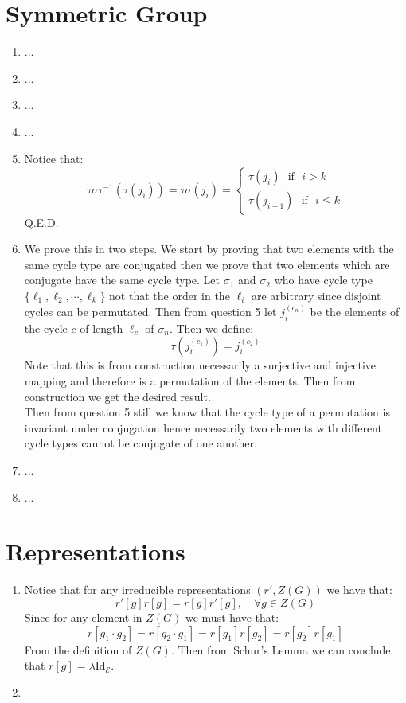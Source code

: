 \documentclass[10pt,a4paper]{book}
\begin{document}
\section{Symmetric Group}
\begin{enumerate}
\item ...

\item ...

\item ...

\item ...

\item Notice that:
\[
\tau \sigma \tau^{-1} ( \tau(j_i)) = \tau \sigma (j_i) = \begin{cases}
\tau(j_i) \mbox{~~if~~} i > k\\
\tau(j_{i+1}) \mbox{~~if~~} i \leq k
\end{cases}
\]
Q.E.D.

\item We prove this in two steps. We start by proving that two elements with the same cycle type are conjugated then we prove that two elements which are conjugate have the same cycle type. Let $\sigma_1$ and $\sigma_2$ who have cycle type $\{\ell_1, \ell_2, \cdots, \ell_k\}$ not that the order in the $\ell_i$ are arbitrary since disjoint cycles can be permutated. Then from question 5 let $j_i^{(c_n)}$ be the elements of the cycle $c$ of length $\ell_c$ of $\sigma_n$. Then we define:
\[
\tau(j_i^{(c_1)}) = j_i^{(c_2)}
\]
Note that this is from construction necessarily a surjective and injective mapping and therefore is a permutation of the elements. Then from construction we get the desired result. \\
Then from question 5 still we know that the cycle type of a permutation is invariant under conjugation hence necessarily two elements with different cycle types cannot be conjugate of one another.

\item ...

\item ...

\end{enumerate}


\section{Representations}

\begin{enumerate}

\item Notice that for any irreducible representations $(r', Z(G))$ we have that:
\[
r'[g] r[g] = r[g] r'[g], \quad \forall g \in Z(G)
\]
Since for any element in $Z(G)$ we must have that:
\[
r[g_1 \cdot g_2] = r[g_2 \cdot g_1] = r[g_1]r[g_2] = r[g_2]r[g_1]
\]
From the definition of $Z(G)$. Then from Schur's Lemma we can conclude that $r[g] = \lambda \text{Id}_\mathcal{E}$. 

\item 

\end{enumerate}
\end{document}
